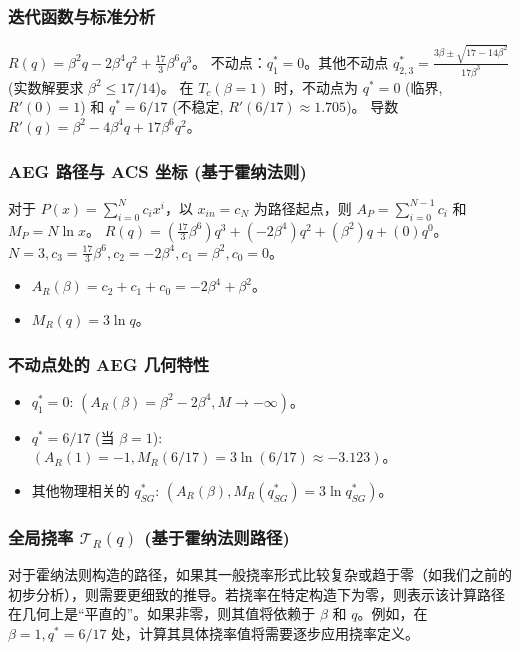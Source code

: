 \documentclass[12pt]{article}
\begin{document}
\subsubsection{迭代函数与标准分析}
$R(q) = \beta^2 q - 2\beta^4 q^2 + \frac{17}{3}\beta^6 q^3$。
不动点：$q_1^*=0$。其他不动点 $q_{2,3}^* = \frac{3\beta \pm \sqrt{17 - 14\beta^2}}{17\beta^3}$ (实数解要求 $\beta^2 \le 17/14$)。
在 $T_c (\beta=1)$ 时，不动点为 $q^*=0$ (临界, $R'(0)=1$) 和 $q^*=6/17$ (不稳定, $R'(6/17) \approx 1.705$)。
导数 $R'(q) = \beta^2 - 4\beta^4 q + 17\beta^6 q^2$。

\subsubsection{AEG 路径与 ACS 坐标 (基于霍纳法则)}
对于 $P(x) = \sum_{i=0}^N c_i x^i$，以 $x_{in}=c_N$ 为路径起点，则 $A_P = \sum_{i=0}^{N-1} c_i$ 和 $M_P = N \ln x$。
$R(q) = (\frac{17}{3}\beta^6) q^3 + (-2\beta^4) q^2 + (\beta^2) q + (0)q^0$。
$N=3, c_3 = \frac{17}{3}\beta^6, c_2 = -2\beta^4, c_1 = \beta^2, c_0 = 0$。
\begin{itemize}
    \item $A_R(\beta) = c_2 + c_1 + c_0 = -2\beta^4 + \beta^2$。
    \item $M_R(q) = 3 \ln q$。
\end{itemize}

\subsubsection{不动点处的 AEG 几何特性}
\begin{itemize}
    \item $q_1^* = 0$: $(A_R(\beta) = \beta^2 - 2\beta^4, M \rightarrow -\infty)$。
    \item $q^* = 6/17$ (当 $\beta=1$): $(A_R(1)=-1, M_R(6/17) = 3\ln(6/17) \approx -3.123)$。
    \item 其他物理相关的 $q_{SG}^*$: $(A_R(\beta), M_R(q_{SG}^*) = 3\ln q_{SG}^*)$。
\end{itemize}

\subsubsection{全局挠率 $\mathcal{T}_R(q)$ (基于霍纳法则路径)}
对于霍纳法则构造的路径，如果其一般挠率形式比较复杂或趋于零（如我们之前的初步分析），则需要更细致的推导。若挠率在特定构造下为零，则表示该计算路径在几何上是“平直的”。如果非零，则其值将依赖于 $\beta$ 和 $q$。例如，在 $\beta=1, q^*=6/17$ 处，计算其具体挠率值将需要逐步应用挠率定义。
\end{document}
